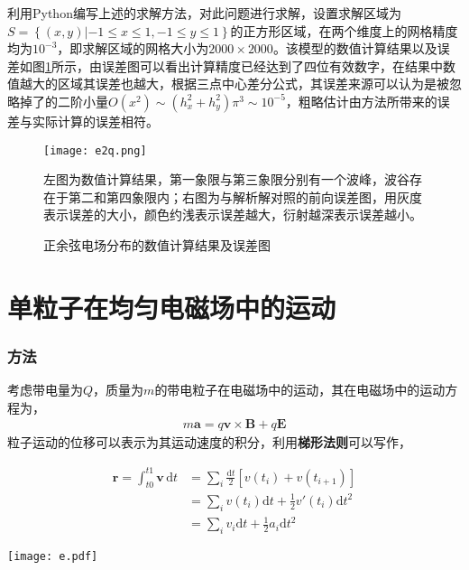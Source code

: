 \documentclass{article} %
\renewcommand{\vec}[1]{\boldsymbol{#1}} %
\begin{document}
利用Python编写上述的求解方法，对此问题进行求解，设置求解区域为$S=\left\{(x,y)|-1\leq x\leq 1,-1\leq y\leq 1\right\}$的正方形区域，在两个维度上的网格精度均为$10^{-3}$，即求解区域的网格大小为$2000\times 2000$。该模型的数值计算结果以及误差如图\ref{F1}所示，由误差图可以看出计算精度已经达到了四位有效数字，在结果中数值越大的区域其误差也越大，根据三点中心差分公式，其误差来源可以认为是被忽略掉了的二阶小量$O(x^2)\sim (h_x^2+h_y^2)\pi^3 \sim 10^{-5}$，粗略估计由方法所带来的误差与实际计算的误差相符。
\begin{figure}
    \begin{center}
        \texttt{[image: e2q.png]}
    \end{center}
    \qquad 左图为数值计算结果，第一象限与第三象限分别有一个波峰，波谷存在于第二和第四象限内；右图为与解析解对照的前向误差图，用灰度表示误差的大小，颜色约浅表示误差越大，衍射越深表示误差越小。
    \caption{正余弦电场分布的数值计算结果及误差图}
    \label{F1}
\end{figure}

\part{单粒子在均匀电磁场中的运动}

\section{方法}
考虑带电量为$Q$，质量为$m$的带电粒子在电磁场中的运动，其在电磁场中的运动方程为，
\begin{align}
    m\vec{a}=q \vec{v} \times \vec{B}+q \vec{E}
\end{align}
粒子运动的位移可以表示为其运动速度的积分，利用\textbf{梯形法则}可以写作，

\begin{minipage}[c]{0.5\linewidth}
    \begin{align}
        \vec{r}=\int_{t0}^{t1} \vec{v} \, \mathrm{d}t&=\sum_i \frac{\mathrm{d}t}{2}[v(t_i)+v(t_{i+1})]\\
        &=\sum_i v(t_i)\mathrm{d}t +\frac{1}{2} v'(t_i) \mathrm{d}t^2\\
        &=\sum_i v_i \mathrm{d}t +\frac{1}{2} a_i \mathrm{d}t^2
    \end{align}
\end{minipage}
\begin{minipage}[c]{0.4\linewidth}
    \texttt{[image: e.pdf]}
\end{minipage}
\end{document}
